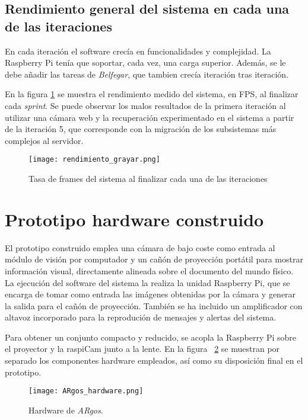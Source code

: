 \subsection{Rendimiento general del sistema en cada una de las iteraciones}
En cada iteración el software crecía en funcionalidades y complejidad. La Raspberry Pi tenía que soportar, cada vez, una carga superior. Además, se le debe añadir las tareas de \textit{Belfegar}, que tambien crecía iteración tras iteración.

En la figura \ref{fig:iteration_chart} se muestra el rendimiento medido del sistema, en FPS, al finalizar cada \textit{sprint}. Se puede observar los malos resultados de la primera iteración al utilizar una cámara web y la recuperación experimentado en el sistema a partir de la iteración 5, que corresponde con la migración de los subsistemas más complejos al servidor.

\begin{figure}
 \begin{center}
    \texttt{[image: rendimiento\_grayar.png]}
    \caption{Tasa de frames del sistema al finalizar cada una de las iteraciones}
    \label{fig:iteration_chart}
  \end{center}
\end{figure}

\section{Prototipo hardware construido}
El prototipo construido emplea una cámara de bajo coste como entrada al módulo de visión por computador y un cañón de proyección portátil para mostrar información visual, directamente alineada sobre el documento del mundo físico. La ejecución del software del sistema la realiza la unidad Raspberry Pi, que se encarga de tomar como entrada las imágenes obtenidas por la cámara y generar la salida para el cañón de proyección. También se ha incluido un amplificador con altavoz incorporado para la reprodución de mensajes y alertas del sistema.

Para obtener un conjunto compacto y reducido, se acopla la Raspberry Pi sobre el proyector y la raspiCam junto a la lente. En la figura ~\ref{fig:ARgos_hardware} se muestran por separado los componentes hardware empleados, así como su disposición final en el prototipo.

\begin{figure}
  \begin{center}
    \texttt{[image: ARgos\_hardware.png]}
    \caption{Hardware de \textit{ARgos}.}
    \label{fig:ARgos_hardware}
  \end{center}
\end{figure}

